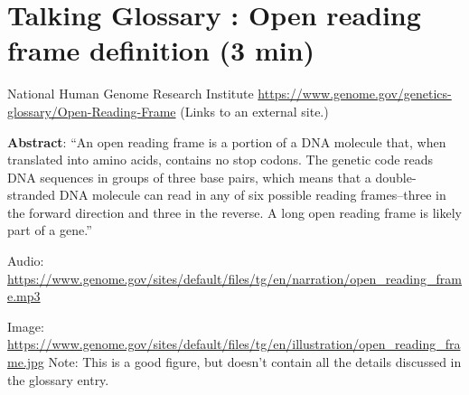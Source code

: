 \documentclass[
]{book}
\begin{document}
\hypertarget{talking-glossary-open-reading-frame-definition-3-min}{%
\section{Talking Glossary : Open reading frame definition (3 min)}\label{talking-glossary-open-reading-frame-definition-3-min}}

National Human Genome Research Institute
\url{https://www.genome.gov/genetics-glossary/Open-Reading-Frame} (Links to an external site.)

\textbf{Abstract}: ``An open reading frame is a portion of a DNA molecule that, when translated into amino acids, contains no stop codons. The genetic code reads DNA sequences in groups of three base pairs, which means that a double-stranded DNA molecule can read in any of six possible reading frames--three in the forward direction and three in the reverse. A long open reading frame is likely part of a gene.''

Audio: \url{https://www.genome.gov/sites/default/files/tg/en/narration/open_reading_frame.mp3}

Image: \url{https://www.genome.gov/sites/default/files/tg/en/illustration/open_reading_frame.jpg}
Note: This is a good figure, but doesn't contain all the details discussed in the glossary entry.
\end{document}
